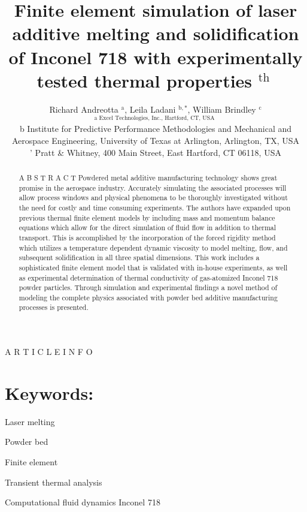 \documentclass[10pt]{article}
\title{Finite element simulation of laser additive melting and solidification of Inconel 718 with experimentally tested thermal properties ${ }^{\text {th }}$ }
\author{Richard Andreotta ${ }^{\mathrm{a}}$, Leila Ladani ${ }^{\mathrm{b}, *}$, William Brindley ${ }^{\mathrm{c}}$\\
${ }^{\text {a Excel Technologies, Inc., Hartford, CT, USA }}$\\
b Institute for Predictive Performance Methodologies and Mechanical and Aerospace Engineering, University of Texas at Arlington, Arlington, TX, USA\\
' Pratt \& Whitney, 400 Main Street, East Hartford, CT 06118, USA}
\date{}
\begin{document}
\maketitle
A R T I C L E I N F O

\section*{Keywords:}
Laser melting

Powder bed

Finite element

Transient thermal analysis

Computational fluid dynamics Inconel 718

\begin{abstract}
A B S T R A C T Powdered metal additive manufacturing technology shows great promise in the aerospace industry. Accurately simulating the associated processes will allow process windows and physical phenomena to be thoroughly investigated without the need for costly and time consuming experiments. The authors have expanded upon previous thermal finite element models by including mass and momentum balance equations which allow for the direct simulation of fluid flow in addition to thermal transport. This is accomplished by the incorporation of the forced rigidity method which utilizes a temperature dependent dynamic viscosity to model melting, flow, and subsequent solidification in all three spatial dimensions. This work includes a sophisticated finite element model that is validated with in-house experiments, as well as experimental determination of thermal conductivity of gas-atomized Inconel 718 powder particles. Through simulation and experimental findings a novel method of modeling the complete physics associated with powder bed additive manufacturing processes is presented.
\end{abstract}
\end{document}
